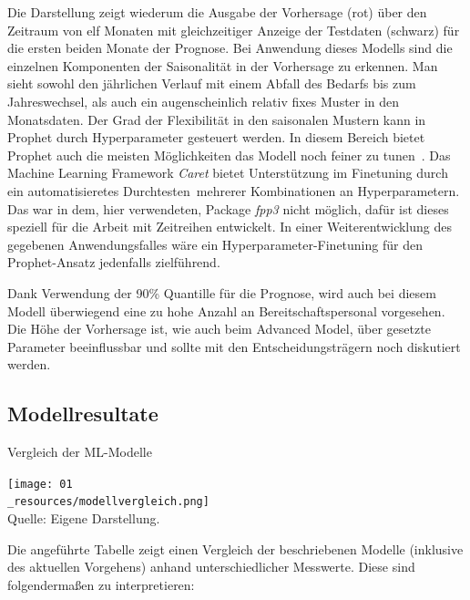 Die Darstellung zeigt wiederum die Ausgabe der Vorhersage (rot) über den Zeitraum von elf Monaten mit gleichzeitiger Anzeige der Testdaten (schwarz) für die ersten beiden Monate der Prognose. Bei Anwendung dieses Modells sind die einzelnen Komponenten der Saisonalität in der Vorhersage zu erkennen. Man sieht sowohl den jährlichen Verlauf mit einem Abfall des Bedarfs bis zum Jahreswechsel, als auch ein augenscheinlich relativ fixes Muster in den Monatsdaten. Der Grad der Flexibilität in den saisonalen Mustern kann in Prophet durch Hyperparameter gesteuert werden. In diesem Bereich bietet Prophet auch die meisten Möglichkeiten das Modell noch feiner zu \glqq tunen\grqq\ . Das Machine Learning Framework \textit{Caret} \citep{kuhn_caret_2019} bietet Unterstützung im Finetuning durch ein automatisieretes \glqq Durchtesten\grqq\ mehrerer Kombinationen an Hyperparametern. Das war in dem, hier verwendeten, Package \textit{fpp3} \citep{hyndman_forecasting_2021} nicht möglich, dafür ist dieses speziell für die Arbeit mit Zeitreihen entwickelt. In einer Weiterentwicklung des gegebenen Anwendungsfalles wäre ein Hyperparameter-Finetuning für den Prophet-Ansatz jedenfalls zielführend. 

Dank Verwendung der 90\% Quantille für die Prognose, wird auch bei diesem Modell überwiegend eine zu hohe Anzahl an Bereitschaftspersonal vorgesehen. Die Höhe der Vorhersage ist, wie auch beim Advanced Model, über gesetzte Parameter beeinflussbar und sollte mit den Entscheidungsträgern noch diskutiert werden.

\newpage 

\subsection{Modellresultate} 

\begin{table}[h]
\centering
\caption{Vergleich der ML-Modelle}
\texttt{[image: 01\\\_resources/modellvergleich.png]}\\
Quelle: Eigene Darstellung.
\label{tab:modeleval}
\end{table}
\FloatBarrier 

Die angeführte Tabelle zeigt einen Vergleich der beschriebenen Modelle (inklusive des aktuellen Vorgehens) anhand unterschiedlicher Messwerte. Diese sind folgendermaßen zu interpretieren:

